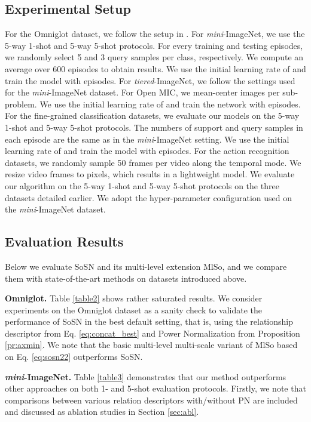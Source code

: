 \subsection{Experimental Setup}
For the Omniglot dataset, we follow the setup in \cite{sung2017learning}. For {\em mini}-ImageNet, we use the  5-way 1-shot and  5-way 5-shot protocols. For every training and testing episodes, we randomly select 5 and 3 query samples per class, respectively. We compute an average over 600 episodes to obtain results. 
We use the initial learning rate of  and train the model with  episodes. For \textit{tiered}-ImageNet, we follow the  settings used for the {\em mini}-ImageNet dataset. 
For Open MIC, we mean-center images per sub-problem. We use the initial learning rate of  and  train the network with  episodes. 
For the fine-grained classification datasets, we evaluate our models on the 5-way 1-shot and  5-way 5-shot protocols. The numbers of support and query samples in each episode are the same as in the {\em mini}-ImageNet setting. We use the initial learning rate of  and train the model with  episodes. 
For the action recognition datasets, we randomly sample 50 frames per video along the temporal mode. We resize video frames to  pixels, which results in a lightweight model. We evaluate our algorithm on the 5-way 1-shot and  5-way 5-shot protocols on the three datasets detailed earlier. We adopt the hyper-parameter configuration used on the {\em mini}-ImageNet dataset.

\subsection{Evaluation Results}
Below we evaluate SoSN and its multi-level extension MlSo, and we compare them with state-of-the-art methods on datasets introduced above. 

\vspace{0.05cm}
\noindent\textbf{Omniglot.} Table \ref{table2} shows rather saturated results. We consider experiments on the Omniglot dataset as a sanity check to validate the performance of SoSN in the best default setting, that is, using the relationship descriptor from Eq. \eqref{eq:concat_best} and Power Normalization from Proposition \ref{pr:axmin}. {We note that the basic multi-level
 multi-scale variant of MlSo based on Eq. \eqref{eq:sosn22} outperforms SoSN.}


\vspace{0.05cm}
\noindent\textbf{{\em mini}-ImageNet.} Table \ref{table3} demonstrates that our method outperforms other approaches on both 1- and 5-shot evaluation protocols.
Firstly, we note that comparisons between various relation descriptors with/without PN are included and discussed as ablation studies in Section \ref{sec:abl}. 

